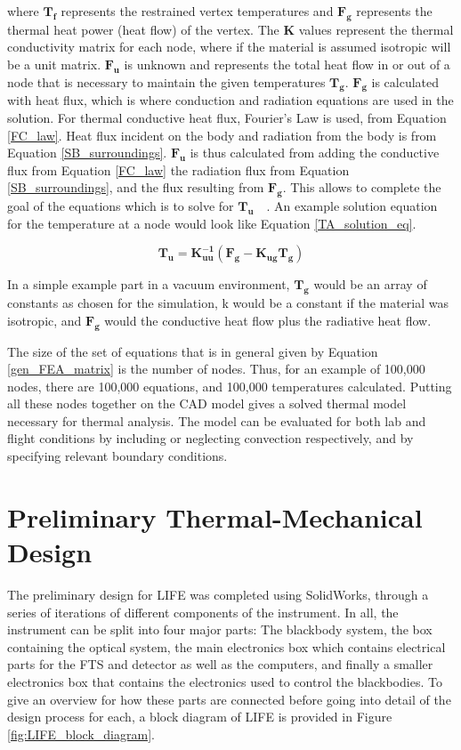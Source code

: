 where $\bm{T_f}$ represents the restrained vertex temperatures and $\bm{F_g}$ represents the thermal heat power (heat flow) of the vertex. The $\bm{K}$ values represent the thermal conductivity matrix for each node, where if the material is assumed isotropic will be a unit matrix. $\bm{F_u}$ is unknown and represents the total heat flow in or out of a node that is necessary to maintain the given temperatures $\bm{T_g}$. $\bm{F_g}$ is calculated with heat flux, which is where conduction and radiation equations are used in the solution. For thermal conductive heat flux, Fourier's Law is used, from Equation \ref{FC_law}. Heat flux incident on the body and radiation from the body is from Equation \ref{SB_surroundings}. $\bm{F_u}$ is thus calculated from adding the conductive flux from Equation \ref{FC_law} the radiation flux from Equation \ref{SB_surroundings}, and the flux resulting from $\bm{F_g}$. This allows to complete the goal of the equations which is to solve for $\bm{T_u}$~\citep{FEA_SW}~\citep{FEA_Procedures}. An example solution equation for the temperature at a node would look like Equation \ref{TA_solution_eq}.

\begin{equation}\label{TA_solution_eq}
    \bm{T_u = K_{uu}^{-1}(F_g-K_{ug}T_g)}
\end{equation}

In a simple example part in a vacuum environment, $\bm{T_g}$ would be an array of constants as chosen for the simulation, k would be a constant if the material was isotropic, and $\bm{F_g}$ would the conductive heat flow plus the radiative heat flow. 

The size of the set of equations that is in general given by Equation \ref{gen_FEA_matrix} is the number of nodes. Thus, for an example of 100,000 nodes, there are 100,000 equations, and 100,000 temperatures calculated. Putting all these nodes together on the CAD model gives a solved thermal model necessary for thermal analysis.  The model can be evaluated for both lab and flight conditions by including or neglecting convection respectively, and by specifying relevant boundary conditions. 

\section{Preliminary Thermal-Mechanical Design}\label{prelim_design}
The preliminary design for LIFE was completed using SolidWorks, through a series of iterations of different components of the instrument. In all, the instrument can be split into four major parts: The blackbody system, the box containing the optical system, the main electronics box which contains electrical parts for the FTS and detector as well as the computers, and finally a smaller electronics box that contains the electronics used to control the blackbodies. To give an overview for how these parts are connected before going into detail of the design process for each, a block diagram of LIFE is provided in Figure \ref{fig:LIFE_block_diagram}.

